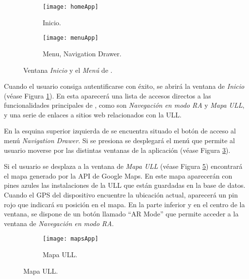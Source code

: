 \begin{figure}[h]
    \hspace*{\fill}%
    \begin{subfigure}[h]{0.32\linewidth}
    \texttt{[image: homeApp]}
    \caption{Inicio.}
    \label{fig:homeApp}
    \end{subfigure} 
    \hfill%
    \begin{subfigure}[h]{0.31\linewidth}
    \texttt{[image: menuApp]}
    \caption{Menu, Navigation Drawer.}
    \label{fig:menuApp}
    \end{subfigure}
    \caption{Ventana \textit{Inicio} y el \textit{Menú} de \textit{\ULLAR{}}.}
    \hspace*{\fill}
\end{figure}

Cuando el usuario consiga autentificarse con éxito, se abrirá la ventana de \textit{Inicio} (véase Figura \ref{fig:homeApp}). En esta aparecerá una lista de accesos directos a las funcionalidades principales de \ULLAR{}, como son \textit{Navegación en modo RA} y \textit{Mapa ULL}, y una serie de enlaces a sitios web relacionados con la ULL.

En la esquina superior izquierda de \ULLAR{} se encuentra situado el botón de acceso al menú \textit{Navigation Drawer}. Si se presiona se desplegará el menú que permite al usuario moverse por las distintas ventanas de la aplicación (véase Figura \ref{fig:menuApp}).

Si el usuario se desplaza a la ventana de \textit{Mapa ULL} (véase Figura \ref{fig:mapsApp}) encontrará el mapa generado por la API de Google Maps. En este mapa aparecerán con pines azules las instalaciones de la ULL que están guardadas en la base de datos. Cuando el GPS del dispositivo encuentre la ubicación actual, aparecerá un pin rojo que indicará su posición en el mapa. En la parte inferior y en el centro de la ventana, se dispone de un botón llamado ``AR Mode'' que permite acceder a la ventana de \textit{Navegación en modo RA}.
  
\begin{figure}[h]
    \hspace*{\fill}%
    \begin{subfigure}[h]{0.37\linewidth}
        \texttt{[image: mapsApp]}
        \caption{Mapa ULL.}
        \label{fig:mapsApp}
    \end{subfigure}
    \hfill%
    \hspace*{\fill}%
\end{figure}

